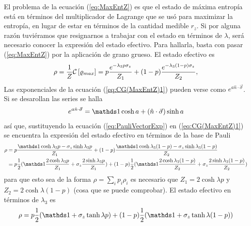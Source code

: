 El problema de la ecuación (\ref{eq:MaxEntZ}) es que el estado de máxima entropía está en términos del multiplicador de Lagrange que se usó para maximizar la entropía, en lugar de estar en términos de la cantidad medible $r_{z}$. Si por alguna razón tuviéramos que resignarnos a trabajar con el estado en términos de $\lambda$, será necesario conocer la expresión del estado efectivo. Para hallarla, basta con pasar (\ref{eq:MaxEntZ}) por la aplicación de grano grueso. El estado efectivo es 
\begin{equation}\label{eq:CG(MaxEntZ)1}
    \rho=\frac{1}{Z}\mathcal{C}\left[\varrho_{max}\right]=p\frac{e^{-\lambda_{3}p\sigma_{z}}}{Z_{1}}+(1-p)\frac{e^{-\lambda_{3}(1-p)\sigma_{z}}}{Z_{2}},
\end{equation}
Las exponenciales de la ecuación (\ref{eq:CG(MaxEntZ)1}) pueden verse como $e^{a\hat{n}\cdot \vec{\sigma}}$. Si se desarollan las series se halla
\begin{equation}\label{eq:PauliVectorExp}
    e^{a\hat{n}\cdot \vec{\sigma}}=\Id \cosh{a}+(\hat{n}\cdot \vec{\sigma})\sinh{a}
\end{equation}
así que, sustituyendo la ecuación (\ref{eq:PauliVectorExp}) en (\ref{eq:CG(MaxEntZ)1}) se encuentra la expresión del estado efectivo en términos de la base de Pauli
\begin{align*}
    \rho&=p\frac{\Id \cosh{\lambda_{3}p}-\sigma_{z}\sinh{\lambda_{3}p}}{Z_{1}}+(1-p)\frac{\Id \cosh{\lambda_{3}(1-p)}-\sigma_{z}\sinh{\lambda_{3}(1-p)}}{Z_{2}}\\
    &=p\frac{1}{2}(\Id \frac{2\cosh{\lambda_{3}p}}{Z_{1}}+\sigma_{z}\frac{2\sinh{\lambda_{3}p}}{Z_{1}})+(1-p)\frac{1}{2}(\Id \frac{2\cosh{\lambda_{3}(1-p)}}{Z_{2}}+\sigma_{z}\frac{2\sinh{\lambda_{3}(1-p)}}{Z_{2}})
\end{align*}
para que esto sea de la forma $\rho=\sum_{i}p_{i}\rho_{i}$ es necesario que $Z_{1}=2\cosh{\lambda p}$ y $Z_{2}=2\cosh{\lambda (1-p)}$ (cosa que se puede comprobar). El estado efectivo en términos de $\lambda_{3}$ es
\begin{equation}\label{eq:CG(MaxEntZ)2}
    \rho=p\frac{1}{2}(\Id+\sigma_{z}\tanh{\lambda p})+(1-p)\frac{1}{2}(\Id+\sigma_{z}\tanh{\lambda (1-p)})
\end{equation}


